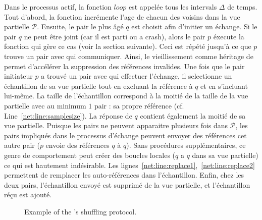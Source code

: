 Dans le processus actif, la fonction $loop$ est appelée tous les intervals
$\Delta$ de temps. Tout d'abord, la fonction incrémente l'age de chacun des
voisins dans la vue partielle $\mathcal{P}$. Ensuite, le pair le plus âgé $q$
est choisit afin d'initier un échange. Si le pair $q$ ne peut être joint (car il
est parti ou a crash), alors le pair $p$ éxecute la fonction qui gère ce cas
(voir la section suivante). Ceci est répété jusqu'à ce que $p$ trouve un pair
avec qui communiquer. Ainsi, le vieillissement comme héritage de \CYCLON permet
d'accélérer la suppression des références invalides. Une fois que le pair
initiateur $p$ a trouvé un pair avec qui effectuer l'échange, il selectionne un
échantillon de sa vue partielle tout en excluant la référence à $q$ et en
s'incluant lui-même. La taille de l'échantillon correspond à la moitié de la
taille de la vue partielle avec au minimum $1$ pair : sa propre référence
(cf. Line~\ref{net:line:samplesize}). La réponse de $q$ contient également la moitié
de sa vue partielle. Puisque les pairs ne peuvent apparaitre plusieurs fois dans
$\mathcal{P}$, les pairs impliqués dans le processus d'échange peuvent envoyer
des références cet autre pair ($p$ envoie des références $q$ à $q$). Sans
procédures supplémentaires, ce genre de comportement peut créer des boucles
locales ($q$ a $q$ dans sa vue partielle) ce qui est hautement indésirable. Les
lignes~\ref{net:line:replace1},~\ref{net:line:replace2} permettent de remplacer les
auto-références dans l'échantillon. Enfin, chez les deux pairs, l'échantillon envoyé 
est supprimé de la vue partielle, et l'échantillon réçu est ajouté.

\begin{figure*}
  \centering
  \hspace{10pt}
  \hspace{10pt}
  \caption{\label{net:fig:cyclicexample}Example of the \SPRAY's shuffling
    protocol. }
\end{figure*}

